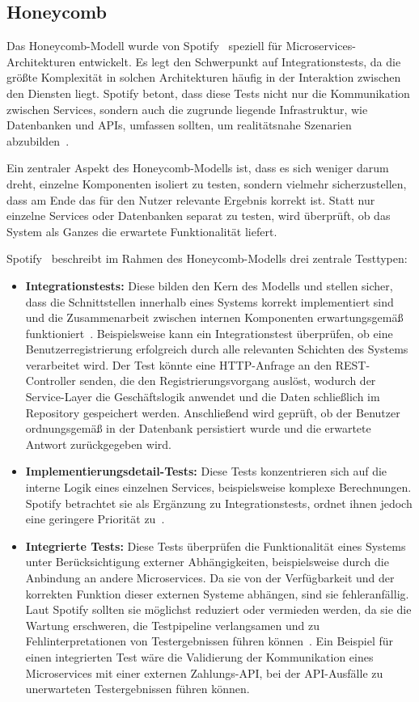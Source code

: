 \subsection{Honeycomb}

Das Honeycomb-Modell wurde von Spotify~\cite{Spotify18} speziell für Microservices-Architekturen entwickelt. Es legt den Schwerpunkt auf Integrationstests, da die größte Komplexität in solchen Architekturen häufig in der Interaktion zwischen den Diensten liegt. Spotify betont, dass diese Tests nicht nur die Kommunikation zwischen Services, sondern auch die zugrunde liegende Infrastruktur, wie Datenbanken und APIs, umfassen sollten, um realitätsnahe Szenarien abzubilden~\cite{Spotify18}.

Ein zentraler Aspekt des Honeycomb-Modells ist, dass es sich weniger darum dreht, einzelne Komponenten isoliert zu testen, sondern vielmehr sicherzustellen, dass am Ende das für den Nutzer relevante Ergebnis korrekt ist. Statt nur einzelne Services oder Datenbanken separat zu testen, wird überprüft, ob das System als Ganzes die erwartete Funktionalität liefert.

Spotify~\cite{Spotify18} beschreibt im Rahmen des Honeycomb-Modells drei zentrale Testtypen:  
\begin{itemize} 
	\item \textbf{Integrationstests:} Diese bilden den Kern des Modells und stellen sicher, dass die Schnittstellen innerhalb eines Systems korrekt implementiert sind und die Zusammenarbeit zwischen internen Komponenten erwartungsgemäß funktioniert~\cite{Spotify18}.  Beispielsweise kann ein Integrationstest überprüfen, ob eine Benutzerregistrierung erfolgreich durch alle relevanten Schichten des Systems verarbeitet wird. Der Test könnte eine HTTP-Anfrage an den REST-Controller senden, die den Registrierungsvorgang auslöst, wodurch der Service-Layer die Geschäftslogik anwendet und die Daten schließlich im Repository gespeichert werden. Anschließend wird geprüft, ob der Benutzer ordnungsgemäß in der Datenbank persistiert wurde und die erwartete Antwort zurückgegeben wird.
	\item \textbf{Implementierungsdetail-Tests:} Diese Tests konzentrieren sich auf die interne Logik eines einzelnen Services, beispielsweise komplexe Berechnungen. Spotify betrachtet sie als Ergänzung zu Integrationstests, ordnet ihnen jedoch eine geringere Priorität zu~\cite{Spotify18}. 
	\item \textbf{Integrierte Tests:} Diese Tests überprüfen die Funktionalität eines Systems unter Berücksichtigung externer Abhängigkeiten, beispielsweise durch die Anbindung an andere Microservices. Da sie von der Verfügbarkeit und der korrekten Funktion dieser externen Systeme abhängen, sind sie fehleranfällig. Laut Spotify sollten sie möglichst reduziert oder vermieden werden, da sie die Wartung erschweren, die Testpipeline verlangsamen und zu Fehlinterpretationen von Testergebnissen führen können~\cite{Spotify18}. Ein Beispiel für einen integrierten Test wäre die Validierung der Kommunikation eines Microservices mit einer externen Zahlungs-API, bei der API-Ausfälle zu unerwarteten Testergebnissen führen können.
\end{itemize}

